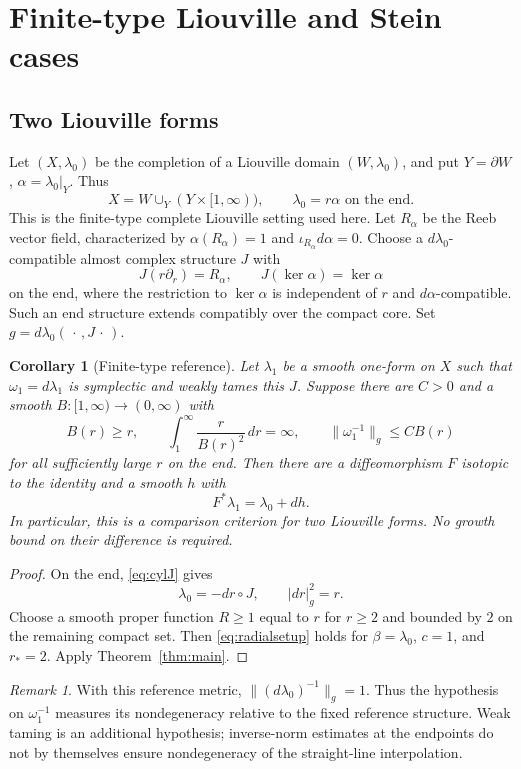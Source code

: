 \documentclass[11pt,a4paper]{article}
\newtheorem{corollary}[theorem]{Corollary}
\theoremstyle{remark}
\newtheorem{remark}[theorem]{Remark}
\newcommand{\abs}[1]{\lvert #1\rvert}
\newcommand{\norm}[1]{\lVert #1\rVert}
\numberwithin{equation}{section}
\begin{document}
\section{Finite-type Liouville and Stein cases}\label{sec:applications}

\subsection{Two Liouville forms}
Let $(X,\lambda_0)$ be the completion of a Liouville domain $(W,\lambda_0)$, and put $Y=\partial W$, $\alpha=\lambda_0|_Y$. Thus
\[
X=W\cup_Y(Y\times[1,\infty)),\qquad
\lambda_0=r\alpha\text{ on the end}.
\]
This is the finite-type complete Liouville setting used here. Let $R_\alpha$ be the Reeb vector field, characterized by $\alpha(R_\alpha)=1$ and $\iota_{R_\alpha}d\alpha=0$. Choose a $d\lambda_0$-compatible almost complex structure $J$ with
\begin{equation}\label{eq:cylJ}
J(r\partial_r)=R_\alpha,\qquad J(\ker\alpha)=\ker\alpha
\end{equation}
on the end, where the restriction to $\ker\alpha$ is independent of $r$ and $d\alpha$-compatible. Such an end structure extends compatibly over the compact core. Set $g=d\lambda_0(\,\cdot\,,J\,\cdot\,)$.

\begin{corollary}[Finite-type reference]\label{cor:liouville}
Let $\lambda_1$ be a smooth one-form on $X$ such that $\omega_1=d\lambda_1$ is symplectic and weakly tames this $J$. Suppose there are $C>0$ and a smooth $B:[1,\infty)\to(0,\infty)$ with
\[
B(r)\ge r,\qquad
\int_1^\infty\frac{r}{B(r)^2}\,dr=\infty,
\qquad \norm{\omega_1^{-1}}_g\le C B(r)
\]
for all sufficiently large $r$ on the end. Then there are a diffeomorphism $F$ isotopic to the identity and a smooth $h$ with
\[
F^*\lambda_1=\lambda_0+dh.
\]
In particular, this is a comparison criterion for two Liouville forms. No growth bound on their difference is required.
\end{corollary}

\begin{proof}
On the end, \eqref{eq:cylJ} gives
\[
\lambda_0=-dr\circ J,\qquad \abs{dr}_g^2=r.
\]
Choose a smooth proper function $R\ge1$ equal to $r$ for $r\ge2$ and bounded by $2$ on the remaining compact set. Then \eqref{eq:radialsetup} holds for $\beta=\lambda_0$, $c=1$, and $r_*=2$. Apply Theorem~\ref{thm:main}.
\end{proof}

\begin{remark}
With this reference metric, $\norm{(d\lambda_0)^{-1}}_g=1$. Thus the hypothesis on $\omega_1^{-1}$ measures its nondegeneracy relative to the fixed reference structure. Weak taming is an additional hypothesis; inverse-norm estimates at the endpoints do not by themselves ensure nondegeneracy of the straight-line interpolation.
\end{remark}
\end{document}
